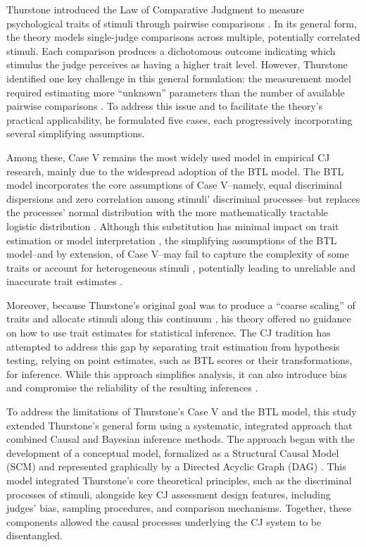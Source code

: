 \documentclass[
  authoryear,
  review,
  1p]{elsarticle}
\begin{document}
Thurstone introduced the Law of Comparative Judgment to measure
psychological traits of stimuli through pairwise comparisons
\citep{Thurstone_1927a, Thurstone_1927b}. In its general form, the
theory models single-judge comparisons across multiple, potentially
correlated stimuli. Each comparison produces a dichotomous outcome
indicating which stimulus the judge perceives as having a higher trait
level. However, Thurstone identified one key challenge in this general
formulation: the measurement model required estimating more ``unknown''
parameters than the number of available pairwise comparisons
\citep{Thurstone_1927b}. To address this issue and to facilitate the
theory's practical applicability, he formulated five cases, each
progressively incorporating several simplifying assumptions.

Among these, Case V remains the most widely used model in empirical CJ
research, mainly due to the widespread adoption of the BTL model. The
BTL model incorporates the core assumptions of Case V--namely, equal
discriminal dispersions and zero correlation among stimuli' discriminal
processes--but replaces the processes' normal distribution with the more
mathematically tractable logistic distribution
\citep{Andrich_1978, Bramley_2008}. Although this substitution has
minimal impact on trait estimation or model interpretation
\citep{vanderLinden_et_al_2017_I, McElreath_2021}, the simplifying
assumptions of the BTL model--and by extension, of Case V--may fail to
capture the complexity of some traits or account for heterogeneous
stimuli
\citep{Thurstone_1927a, Andrich_1978, Bramley_2008, Kelly_et_al_2022},
potentially leading to unreliable and inaccurate trait estimates
\citep{Ackerman_1989, Zimmerman_1994, McElreath_2020, Hoyle_et_al_2023}.

Moreover, because Thurstone's original goal was to produce a ``coarse
scaling'' of traits and allocate stimuli along this continuum
\citep[p.~269]{Thurstone_1927a}, his theory offered no guidance on how
to use trait estimates for statistical inference. The CJ tradition has
attempted to address this gap by separating trait estimation from
hypothesis testing, relying on point estimates, such as BTL scores or
their transformations, for inference. While this approach simplifies
analysis, it can also introduce bias and compromise the reliability of
the resulting inferences
\citep{McElreath_2020, Kline_et_al_2023, Hoyle_et_al_2023}.

To address the limitations of Thurstone's Case V and the BTL model, this
study extended Thurstone's general form using a systematic, integrated
approach that combined Causal and Bayesian inference methods. The
approach began with the development of a conceptual model, formalized as
a Structural Causal Model (SCM) and represented graphically by a
Directed Acyclic Graph (DAG)
\citep{Pearl_2009, Pearl_et_al_2016, Gross_et_al_2018, Neal_2020}. This
model integrated Thurstone's core theoretical principles, such as the
discriminal processes of stimuli, alongside key CJ assessment design
features, including judges' bias, sampling procedures, and comparison
mechanisms. Together, these components allowed the causal processes
underlying the CJ system to be disentangled.
\end{document}
